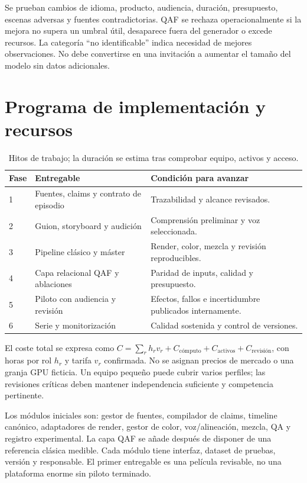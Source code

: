 Se prueban cambios de idioma, producto, audiencia, duración, presupuesto, escenas adversas y fuentes contradictorias. QAF se rechaza operacionalmente si la mejora no supera un umbral útil, desaparece fuera del generador o excede recursos. La categoría ``no identificable'' indica necesidad de mejores observaciones. No debe convertirse en una invitación a aumentar el tamaño del modelo sin datos adicionales.

\section{Programa de implementación y recursos}
\begin{table}[ht]\centering\compacttable
\begin{tabular}{p{.15\linewidth}p{.36\linewidth}p{.37\linewidth}}\toprule
Fase & Entregable & Condición para avanzar \\\midrule
1 & Fuentes, claims y contrato de episodio & Trazabilidad y alcance revisados.\\
2 & Guion, storyboard y audición & Comprensión preliminar y voz seleccionada.\\
3 & Pipeline clásico y máster & Render, color, mezcla y revisión reproducibles.\\
4 & Capa relacional QAF y ablaciones & Paridad de inputs, calidad y presupuesto.\\
5 & Piloto con audiencia y revisión & Efectos, fallos e incertidumbre publicados internamente.\\
6 & Serie y monitorización & Calidad sostenida y control de versiones.\\\bottomrule
\end{tabular}\caption{Hitos de trabajo; la duración se estima tras comprobar equipo, activos y acceso.}
\end{table}

El coste total se expresa como $C=\sum_r h_rv_r+C_{\mathrm{cómputo}}+C_{\mathrm{activos}}+C_{\mathrm{revisión}}$, con horas por rol $h_r$ y tarifa $v_r$ confirmada. No se asignan precios de mercado o una granja GPU ficticia. Un equipo pequeño puede cubrir varios perfiles; las revisiones críticas deben mantener independencia suficiente y competencia pertinente.

Los módulos iniciales son: gestor de fuentes, compilador de claims, timeline canónico, adaptadores de render, gestor de color, voz/alineación, mezcla, QA y registro experimental. La capa QAF se añade después de disponer de una referencia clásica medible. Cada módulo tiene interfaz, dataset de pruebas, versión y responsable. El primer entregable es una película revisable, no una plataforma enorme sin piloto terminado.

